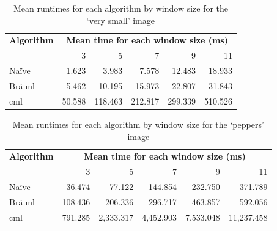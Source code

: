 \begin{table}
\centering
\begin{tabular}{@{}lrrrrr@{}}
\toprule
\multicolumn{1}{c}{\textbf{Algorithm}} & \multicolumn{5}{c}{\textbf{Mean time for each window size (ms)}} \\
                              & 3        & 5         & 7         & 9         & 11       \\ \midrule
Naïve                         & 1.623    & 3.983     & 7.578     & 12.483    & 18.933   \\
Bräunl                        & 5.462    & 10.195    & 15.973    & 22.807    & 31.843   \\
\gls{cml}                           & 50.588   & 118.463   & 212.817   & 299.339   & 510.526  \\ \bottomrule
\end{tabular}
\caption[Mean runtimes for each algorithm for the `very small' image]{Mean runtimes for each algorithm by window size for the `very small' image}
\label{tab:median:verysmall}
\end{table}

\begin{table}
\centering
\begin{tabular}{@{}lrrrrr@{}}
\toprule
\multicolumn{1}{c}{\textbf{Algorithm}} & \multicolumn{5}{c}{\textbf{Mean time for each window size (ms)}}  \\
                              & 3       & 5         & 7         & 9         & 11         \\ \midrule
Naïve                         & 36.474  & 77.122    & 144.854   & 232.750   & 371.789    \\
Bräunl                        & 108.436 & 206.336   & 296.717   & 463.857   & 592.056    \\
\gls{cml}                           & 791.285 & 2,333.317 & 4,452.903 & 7,533.048 & 11,237.458 \\ \bottomrule
\end{tabular}
\caption[Mean runtimes for each algorithm for the `peppers' image]{
\label{tab:median:peppers}Mean runtimes for each algorithm by window size for the `peppers' image}
\end{table}

